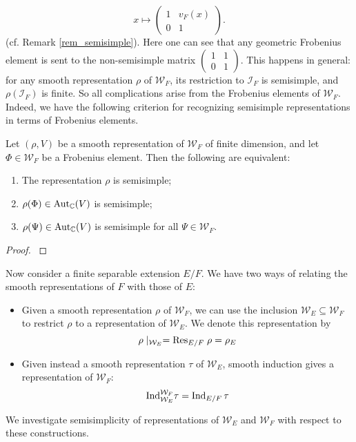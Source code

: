 \[x\mapsto \begin{pmatrix}
		1&v_F(x)\\
		0&1
	\end{pmatrix}.\]
(cf. Remark \ref{rem_semisimple}). Here one can see that any geometric Frobenius element is sent to the non-semisimple matrix $\left(\begin{smallmatrix}
	1&1\\0&1
\end{smallmatrix}\right)$.  This happens in general: for any smooth representation $\rho$ of $\mathcal{W}_F$, its restriction to $\mathcal{I}_F$ is semisimple, and $\rho(\mathcal{I}_F)$ is finite. So all complications arise from the Frobenius elements of $\mathcal{W}_F$. Indeed, we have the following criterion for recognizing semisimple representations in terms of Frobenius elements.
\begin{prop}
	Let $(\rho, V)$ be a smooth representation of $\mathcal{W}_F$ of finite dimension, and let $\Phi\in \mathcal{W}_F$ be a Frobenius element. Then the following are equivalent:
	\begin{enumerate}
		\item The representation $\rho$ is semisimple;
		\item $\rho(\Phi)\in \mathrm{Aut}_{\mathbb{C}}(V)$ is semisimple;
		\item $\rho(\Psi)\in \mathrm{Aut}_{\mathbb{C}}(V)$ is semisimple for all $\Psi\in \mathcal{W}_F$.
	\end{enumerate}
\end{prop}
\begin{proof}
	\cite[Proposition 28.7]{BH1}
\end{proof}


Now consider a finite separable extension $E/F$. We have two ways of relating the smooth representations of $F$ with those of $E$:
\begin{itemize}
	\item Given a smooth representation $\rho$ of $\mathcal{W}_F$, we can use the inclusion $\mathcal{W}_E\subseteq \mathcal{W}_F$ to restrict $\rho$ to a representation of $\mathcal{W}_E$. We denote this representation by 
	\[\rho\mid_{\mathcal{W}_E} = \mathrm{Res}_{E/F} \;\rho = \rho_E\]
	\item Given instead a smooth representation $\tau$ of $\mathcal{W}_E$, smooth induction gives a representation of $\mathcal{W}_F$:
	\[\mathrm{Ind}_{\mathcal{W}_E}^{\mathcal{W}_F}\tau = \mathrm{Ind}_{E/F}\, \tau\]
\end{itemize}
We investigate semisimplicity of representations of $\mathcal{W}_E$ and $\mathcal{W}_F$ with respect to these constructions.

